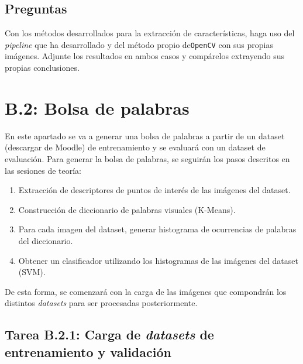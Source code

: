 \subsection*{Preguntas}

\vspace{5mm}
\begin{tcolorbox}[colback=gray!10, colframe=gray!30, coltitle=black, title=Pregunta C.1: Correspodencia de imágenes propias y evaluación, halign=left]
Con los métodos desarrollados para la extracción de características, haga uso del \textit{pipeline} que ha desarrollado y del método propio de\texttt{OpenCV} con sus propias imágenes. Adjunte los resultados en ambos casos y compárelos extrayendo sus propias conclusiones.
\end{tcolorbox}

\newpage
\section*{B.2: Bolsa de palabras}
{}

En este apartado se va a generar una bolsa de palabras a partir de un dataset (descargar de Moodle) de entrenamiento y se evaluará con un dataset de evaluación. Para generar la bolsa de palabras, se seguirán los pasos descritos en las sesiones de teoría:

\begin{enumerate}
    \item Extracción de descriptores de puntos de interés de las imágenes del dataset.
    \item Construcción de diccionario de palabras visuales (K-Means).
    \item Para cada imagen del dataset, generar histograma de ocurrencias de palabras del diccionario.
    \item Obtener un clasificador utilizando los histogramas de las imágenes del dataset (SVM).
\end{enumerate}

De esta forma, se comenzará con la carga de las imágenes que compondrán los distintos \textit{datasets} para ser procesadas posteriormente.

\subsection*{Tarea B.2.1: Carga de \textit{datasets} de entrenamiento y validación}

